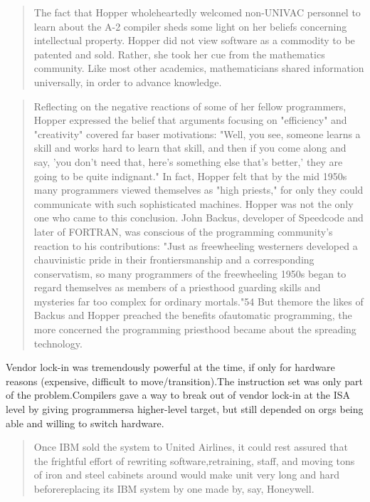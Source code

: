 \begin{quotation}
	The fact that Hopper wholeheartedly welcomed non-UNIVAC personnel to learn about
	the A-2 compiler sheds some light on her beliefs concerning intellectual
	property. Hopper did not view software as a commodity to be patented and
	sold. Rather, she took her cue from the mathematics community. Like most other
	academics, mathematicians shared information universally, in order to advance
	knowledge.
\end{quotation}
\begin{quotation}
	Reflecting on the negative reactions of some of her fellow programmers, Hopper
	expressed the belief that arguments focusing on "efficiency" and "creativity"
	covered far baser motivations: "Well, you see, someone learns a skill and works
	hard to learn that skill, and then if you come along and say, 'you don't
	need that, here's something else that's better,' they are going to be
	quite indignant." In fact, Hopper felt that by the mid 1950s many programmers
	viewed themselves as "high priests," for only they could communicate with such
	sophisticated machines. Hopper was not the only one who came to this
	conclusion. John Backus, developer of Speedcode and later of FORTRAN, was
	conscious of the programming community's reaction to his contributions: "Just as
	freewheeling westerners developed a chauvinistic pride in their frontiersmanship
	and a corresponding conservatism, so many programmers of the freewheeling 1950s
	began to regard themselves as members of a priesthood guarding skills and
	mysteries far too complex for ordinary mortals."54 But themore the likes of
	Backus and Hopper preached the benefits ofautomatic programming, the more
	concerned the programming priesthood became about the spreading
	technology.
\end{quotation}
Vendor lock-in was tremendously powerful at the time, if only for hardware
reasons (expensive, difficult to move/transition).The instruction set was only
part of the problem.Compilers gave a way to break out of vendor lock-in at the
ISA level by giving programmersa higher-level target, but still depended on
orgs being able and willing to switch hardware.
\begin{quotation}
	Once IBM sold the system to United Airlines, it could rest assured that the
	frightful effort of rewriting software,retraining, staff, and moving tons of
	iron and steel cabinets around would make unit very long and hard
	beforereplacing its IBM system by one made by, say, Honeywell.
\end{quotation}

